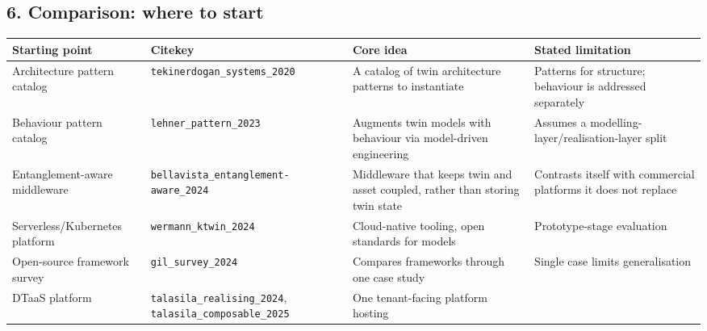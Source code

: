 \documentclass[
  12pt,
  a4paper,
]{article}
\begin{document}
\subsection{6. Comparison: where to
start}\label{comparison-where-to-start}

\begin{longtable}[]{@{}
  >{\raggedright\arraybackslash}p{}
  >{\raggedright\arraybackslash}p{}
  >{\raggedright\arraybackslash}p{}
  >{\raggedright\arraybackslash}p{}@{}}
\toprule\noalign{}
\begin{minipage}[b]{\linewidth}\raggedright
Starting point
\end{minipage} & \begin{minipage}[b]{\linewidth}\raggedright
Citekey
\end{minipage} & \begin{minipage}[b]{\linewidth}\raggedright
Core idea
\end{minipage} & \begin{minipage}[b]{\linewidth}\raggedright
Stated limitation
\end{minipage} \\
\midrule\noalign{}
\endhead
\bottomrule\noalign{}
\endlastfoot
Architecture pattern catalog & \texttt{tekinerdogan\_systems\_2020} & A
catalog of twin architecture patterns to instantiate & Patterns for
structure; behaviour is addressed separately \\
Behaviour pattern catalog & \texttt{lehner\_pattern\_2023} & Augments
twin models with behaviour via model-driven engineering & Assumes a
modelling-layer/realisation-layer split \\
Entanglement-aware middleware &
\texttt{bellavista\_entanglement-aware\_2024} & Middleware that keeps
twin and asset coupled, rather than storing twin state & Contrasts
itself with commercial platforms it does not replace \\
Serverless/Kubernetes platform & \texttt{wermann\_ktwin\_2024} &
Cloud-native tooling, open standards for models & Prototype-stage
evaluation \\
Open-source framework survey & \texttt{gil\_survey\_2024} & Compares
frameworks through one case study & Single case limits generalisation \\
DTaaS platform & \texttt{talasila\_realising\_2024},
\texttt{talasila\_composable\_2025} & One tenant-facing platform hosting

\end{longtable}
\end{document}
